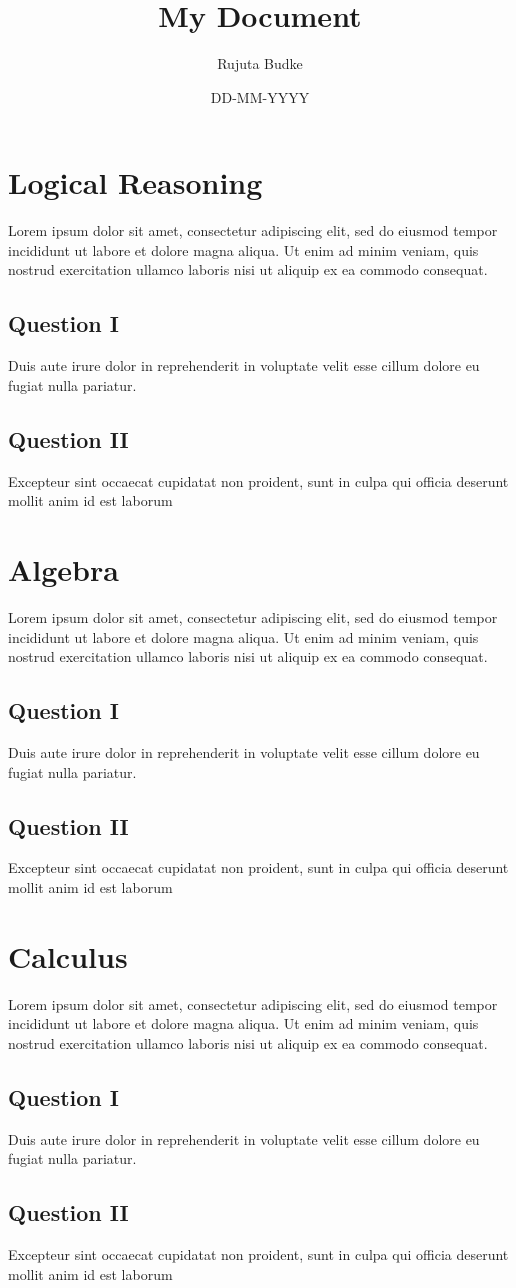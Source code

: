 \documentclass[a4paper]{article}
\begin{document}
  
\title{My Document}
\date{DD-MM-YYYY}
\author{Rujuta Budke}
\maketitle
\newpage

\section{Logical Reasoning}
Lorem ipsum dolor sit amet, consectetur adipiscing elit, sed do eiusmod tempor incididunt ut labore et dolore magna aliqua. Ut enim ad minim veniam, quis nostrud exercitation ullamco laboris nisi ut aliquip ex ea commodo consequat.
 
\subsection*{Question I}
Duis aute irure dolor in reprehenderit in voluptate velit esse cillum dolore eu fugiat nulla pariatur. 

\subsection*{Question II}
Excepteur sint occaecat cupidatat non proident, sunt in culpa qui officia deserunt mollit anim id est laborum


\newpage
\section{Algebra}
Lorem ipsum dolor sit amet, consectetur adipiscing elit, sed do eiusmod tempor incididunt ut labore et dolore magna aliqua. Ut enim ad minim veniam, quis nostrud exercitation ullamco laboris nisi ut aliquip ex ea commodo consequat. 

\subsection*{Question I}
Duis aute irure dolor in reprehenderit in voluptate velit esse cillum dolore eu fugiat nulla pariatur. 

\subsection*{Question II}
Excepteur sint occaecat cupidatat non proident, sunt in culpa qui officia deserunt mollit anim id est laborum


\newpage
\section{Calculus}
Lorem ipsum dolor sit amet, consectetur adipiscing elit, sed do eiusmod tempor incididunt ut labore et dolore magna aliqua. Ut enim ad minim veniam, quis nostrud exercitation ullamco laboris nisi ut aliquip ex ea commodo consequat. 

\subsection*{Question I}
Duis aute irure dolor in reprehenderit in voluptate velit esse cillum dolore eu fugiat nulla pariatur. 

\subsection*{Question II}
Excepteur sint occaecat cupidatat non proident, sunt in culpa qui officia deserunt mollit anim id est laborum
\end{document}
